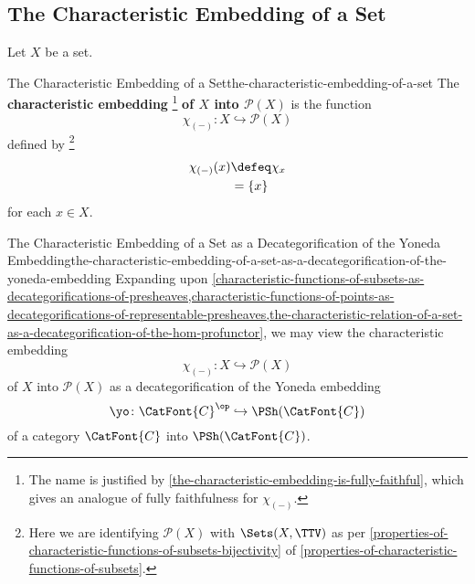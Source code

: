 \subsection{The Characteristic Embedding of a Set}\label{subsection-the-characteristic-embedding-of-a-set}
Let $X$ be a set.
\begin{definition}{The Characteristic Embedding of a Set}{the-characteristic-embedding-of-a-set}%
    The \textbf{characteristic embedding}%
    \footnote{%
        The name  is justified by \cref{the-characteristic-embedding-is-fully-faithful}, which gives an analogue of fully faithfulness for $\chi_{(-)}$.
    } %
    \textbf{of $X$ into $\mathcal{P}(X)$} is the function%
    \[%
        \chi_{(-)}%
        \colon%
        X
        \hookrightarrow%
        \mathcal{P}(X)
    \]%
    defined by%
    \footnote{%
        Here we are identifying $\mathcal{P}(X)$ with $\Sets(X,\TTV)$ as per \cref{properties-of-characteristic-functions-of-subsets-bijectivity} of \cref{properties-of-characteristic-functions-of-subsets}.
        \par\vspace*{\TCBBoxCorrection}
    }%
    \begin{align*}
        \chi_{(-)}(x) &\defeq \chi_{x}\\
                      &=      \{x\}
    \end{align*}
    for each $x\in X$.
\end{definition}
\begin{remark}{The Characteristic Embedding of a Set as a Decategorification of the Yoneda Embedding}{the-characteristic-embedding-of-a-set-as-a-decategorification-of-the-yoneda-embedding}%
    Expanding upon \cref{characteristic-functions-of-subsets-as-decategorifications-of-presheaves,characteristic-functions-of-points-as-decategorifications-of-representable-presheaves,the-characteristic-relation-of-a-set-as-a-decategorification-of-the-hom-profunctor}, we may view the characteristic embedding%
    \[
        \chi_{(-)}%
        \colon%
        X%
        \hookrightarrow%
        \mathcal{P}(X)%
    \]%
    of $X$ into $\mathcal{P}(X)$ as a decategorification of the Yoneda embedding
    \[
        \yo%
        \colon%
        \CatFont{C}^{\op}
        \hookrightarrow
        \PSh(\CatFont{C})
    \]%
    of a category $\CatFont{C}$ into $\PSh(\CatFont{C})$.
\end{remark}
